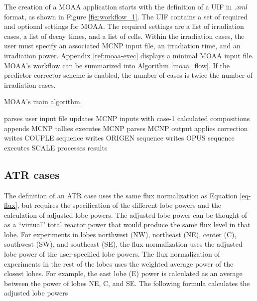 The creation of a MOAA application starts with the definition of a \gls*{UIF} in \textit{.xml} format, as shown in Figure \ref{fig:workflow_1}.
The UIF contains a set of required and optional settings for MOAA.
The required settings are a list of irradiation cases, a list of decay times, and a list of cells.
Within the irradiation cases, the user must specify an associated MCNP input file, an irradiation time, and an irradiation power.
Appendix \ref{ref:moaa-exec} displays a minimal MOAA input file.
MOAA's workflow can be summarized into Algorithm \ref{moaa_flow}.
If the predictor-corrector scheme is enabled, the number of cases is twice the number of irradiation cases.

\begin{algorithm}
  \caption{MOAA's main algorithm.}
  \label{moaa_flow}
  \begin{algorithmic}[1]
    \State parses user input file
        \State updates MCNP inputs with case-1 calculated compositions  
      \EndIf
      \State appends MCNP tallies
      \State executes MCNP
      \State parses MCNP output
        \State applies correction
      \EndIf
      \State writes COUPLE sequence
      \State writes ORIGEN sequence
      \State writes OPUS sequence
      \State executes SCALE
      \State processes results
    \EndFor
  \end{algorithmic}
\end{algorithm}



\subsection{ATR cases}
\label{sec:atr}

The definition of an ATR case uses the same flux normalization as Equation \ref{eq-flux}, but requires the specification of the different lobe powers and the calculation of adjusted lobe powers.
The adjusted lobe power can be thought of as a ``virtual'' total reactor power that would produce the same flux level in that lobe.
For experiments in lobes northwest (NW), northeast (NE), center (C), southwest (SW), and southeast (SE), the flux normalization uses the adjusted lobe power of the user-specified lobe powers.
The flux normalization of experiments in the rest of the lobes uses the weighted average power of the closest lobes.
For example, the east lobe (E) power is calculated as an average between the power of lobes NE, C, and SE.
The following formula calculates the adjusted lobe powers

